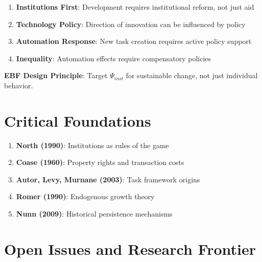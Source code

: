 \begin{tcolorbox}[colback=yellow!5!white,colframe=yellow!75!black,title=Policy Implications from Acemoglu]
\begin{enumerate}
    \item \textbf{Institutions First}: Development requires institutional reform, not just aid
    \item \textbf{Technology Policy}: Direction of innovation can be influenced by policy
    \item \textbf{Automation Response}: New task creation requires active policy support
    \item \textbf{Inequality}: Automation effects require compensatory policies
\end{enumerate}

\textbf{EBF Design Principle}: Target $\Psi_{inst}$ for sustainable change, not just individual behavior.
\end{tcolorbox}

\section{Critical Foundations}

\begin{tcolorbox}[colback=orange!5!white,colframe=orange!75!black,title=Critical Foundations]
\begin{enumerate}
    \item \textbf{North (1990)}: Institutions as rules of the game
    \item \textbf{Coase (1960)}: Property rights and transaction costs
    \item \textbf{Autor, Levy, Murnane (2003)}: Task framework origins
    \item \textbf{Romer (1990)}: Endogenous growth theory
    \item \textbf{Nunn (2009)}: Historical persistence mechanisms
\end{enumerate}
\end{tcolorbox}

\section{Open Issues and Research Frontier}


